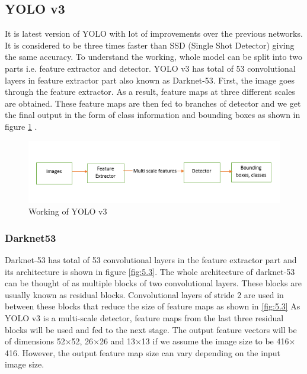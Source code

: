   \subsection{YOLO v3}
  It is latest version of YOLO with lot of improvements over the previous networks. It is considered to be three times faster than SSD (Single Shot Detector) giving the same accuracy. To understand the working, whole model can be split into two parts i.e. feature extractor and detector. YOLO v3 has total of 53 convolutional layers in feature extractor part also known as Darknet-53. First, the image goes through the feature extractor. As a result, feature maps at three different scales are obtained. These feature maps are then fed to branches of detector and we get the final output in the form of class information and bounding boxes as shown in figure \ref{fig:5.2} \cite{chap_5_article:3}.
  \begin{figure}[H]
    \centering
    \captionsetup{justification = centering}
    \includegraphics[scale= 1]{CHAPTERS/Chapter-5/images/5.2.png}
    \caption{Working of YOLO v3 } 
    \label{fig:5.2}
  \end{figure}
  \subsubsection{Darknet53}
    Darknet-53 has total of 53 convolutional layers in the feature extractor part and its architecture is shown in figure \ref{fig:5.3}. The whole architecture of darknet-53 can be thought of as multiple blocks of two convolutional layers. These blocks are usually known as residual blocks. Convolutional layers of stride 2 are used in between these blocks that reduce the size of feature maps as shown in \ref{fig:5.3} As YOLO v3 is a multi-scale detector, feature maps from the last three residual blocks will be used and fed to the next stage. The output feature vectors will be of dimensions 52$\times$52, 26$\times$26 and 13$\times$13 if we assume the image size to be 416$\times$416. However, the output feature map size can vary depending on the input image size.
